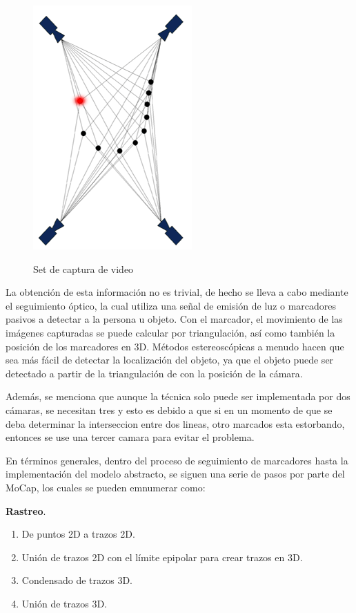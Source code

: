 \documentclass[11pt,letterpaper]{article}     %
\begin{document}
\begin{figure}[hbtp]
\caption{Set de captura de video}
\centering
\includegraphics[scale=1]{imagenes/ppt_area.png}
\label{fig:4camaras}
\end{figure}


La obtenci\' on de esta informaci\' on no es trivial, de hecho se lleva a cabo mediante el seguimiento óptico, la cual utiliza una señal de emisión de luz o marcadores pasivos a detectar a la persona u objeto. Con el marcador, el movimiento de las imágenes capturadas  se puede calcular por triangulación, as\' i como tambi\' en la posición de los marcadores en 3D. 
Métodos estereoscópicas a menudo hacen que sea más fácil de detectar la localizaci\' on del objeto, ya que el objeto puede ser detectado a partir de la triangulación de con la posición de la cámara.

Adem\' as, se menciona que aunque la t\' ecnica solo puede ser implementada por dos c\' amaras, se necesitan tres y esto es debido a que si en un momento de que se deba determinar la interseccion entre dos lineas, otro marcados esta estorbando, entonces se use una tercer camara para evitar el problema.

En t\' erminos generales, dentro del proceso de seguimiento de marcadores hasta la implementaci\' on del modelo abstracto, se siguen una serie de pasos por parte del MoCap, los cuales se pueden emnumerar como:

\textbf{Rastreo}.
\begin{enumerate} 
\item De puntos 2D a trazos 2D.
\item Uni\' on de trazos 2D con el l\' imite epipolar para crear trazos en 3D.
\item Condensado de trazos 3D.
\item Uni\' on de trazos 3D.
\end{enumerate}
\end{document}
